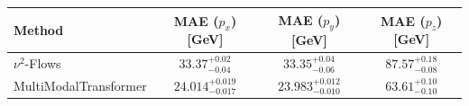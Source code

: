     \begin{tabular}{lccc}
        \toprule
        Method & MAE ($p_x$) [GeV] & MAE ($p_y$) [GeV] & MAE ($p_z$) [GeV] \\
        \midrule
        $\nu^2$-Flows & $33.37^{+0.02}_{-0.04}$ & $33.35^{+0.04}_{-0.06}$ & $87.57^{+0.18}_{-0.08}$ \\
        MultiModalTransformer & $24.014^{+0.019}_{-0.017}$ & $23.983^{+0.012}_{-0.010}$ & $63.61^{+0.10}_{-0.10}$ \\
        \bottomrule
    \end{tabular}